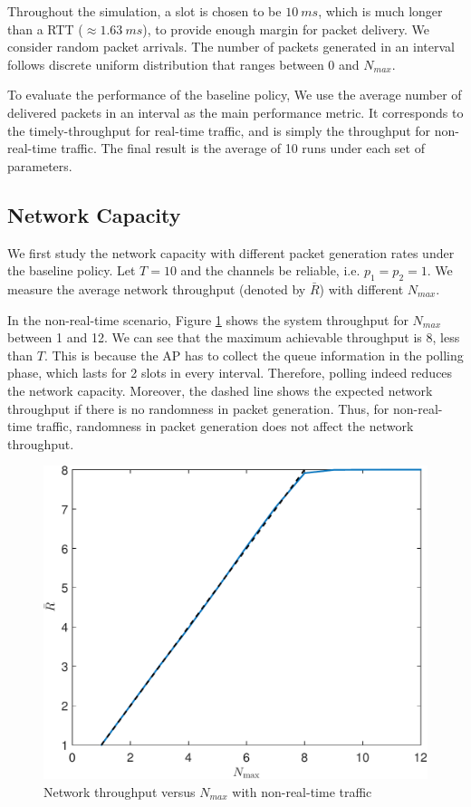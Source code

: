 \documentclass{article}
\begin{document}
Throughout the simulation, a slot is chosen to be $\SI{10}{ms}$, which is much
longer than a RTT ($\approx\SI{1.63}{ms}$), to provide enough margin for packet
delivery. We consider random packet arrivals. The number of packets generated in
an interval follows discrete uniform distribution that ranges between 0 and
$N_{max}$.

To evaluate the performance of the baseline policy, We use the average number of
delivered packets in an interval as the main performance metric. It corresponds
to the timely-throughput for real-time traffic, and is simply the throughput for
non-real-time traffic. The final result is the average of 10 runs under each
set of parameters.

\label{section: simulation}
\subsection{Network Capacity}
We first study the network capacity with different packet generation rates under the baseline policy. Let $T=10$ and the channels be reliable, i.e. $p_1 = p_2 = 1$.
We measure the average network throughput (denoted by $\bar{R}$) with different $N_{max}$.

In the non-real-time scenario, Figure \ref{nonrealtime_throughput_randmax} shows the system throughput for $N_{max}$ between 1 and 12. We can see that the maximum achievable throughput is 8, less than $T$. This is because the AP has to collect the queue information in the polling phase, which lasts for 2 slots in every interval. Therefore, polling indeed reduces the network capacity. Moreover, the dashed line shows the expected network throughput if there is no randomness in packet generation. Thus, for non-real-time traffic, randomness in packet generation does not affect the network throughput.
\begin{figure}[htbp]
\centering
\includegraphics[width=.6\textwidth]{nonrealtime_throughput_randmax.pdf}
\caption{Network throughput versus $N_{max}$ with non-real-time traffic}
\label{nonrealtime_throughput_randmax}
\end{figure}
\end{document}
